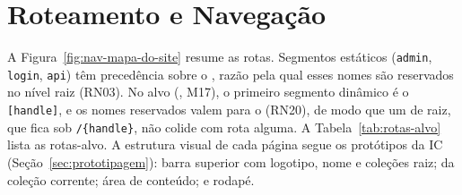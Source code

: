 
\section{Roteamento e Navegação}\label{sec:arq-rotas}

A Figura~\ref{fig:nav-mapa-do-site} resume as rotas. Segmentos estáticos (\texttt{admin}, \texttt{login}, \texttt{api}) têm precedência sobre o  \arq{[...slug]}, razão pela qual esses nomes são reservados no nível raiz (RN03). No alvo (, M17), o primeiro segmento dinâmico é o \texttt{[handle]}, e os nomes reservados valem para o  (RN20), de modo que um  de raiz, que fica sob \texttt{/\{handle\}}, não colide com rota alguma. A Tabela~\ref{tab:rotas-alvo} lista as rotas-alvo. A estrutura visual de cada página segue os protótipos da IC (Seção~\ref{sec:prototipagem}): barra superior com logotipo, nome e coleções raiz;  da coleção corrente; área de conteúdo; e rodapé.


